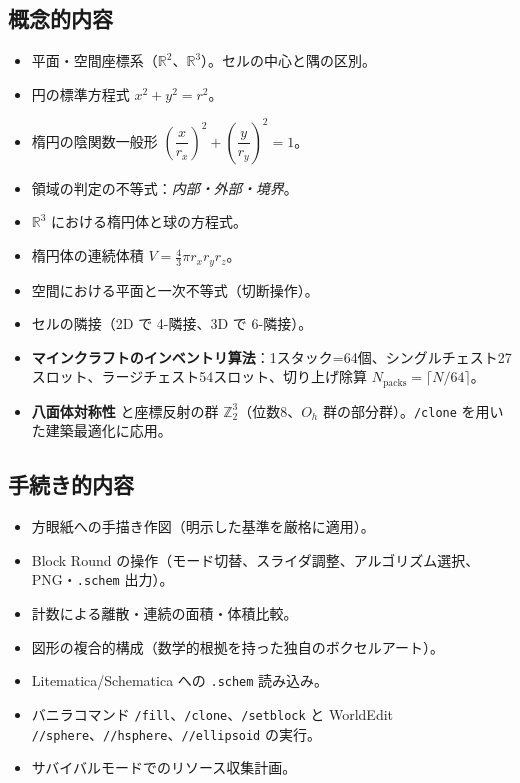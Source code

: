 \documentclass[12pt,a4paper]{scrartcl}
\newcommand{\acc}[1]{\textcolor{accent}{\textbf{#1}}}
\newcommand{\cmd}[1]{\textcolor{earth}{\texttt{\small #1}}}
\begin{document}
\subsection{概念的内容}
\begin{itemize}[leftmargin=1.3em,itemsep=0.15em,topsep=0.3em]
  \item 平面・空間座標系（$\mathbb{R}^2$、$\mathbb{R}^3$）。セルの中心と隅の区別。
  \item 円の標準方程式 $x^2 + y^2 = r^2$。
  \item 楕円の陰関数一般形 $\left(\dfrac{x}{r_x}\right)^{\!2} + \left(\dfrac{y}{r_y}\right)^{\!2} = 1$。
  \item 領域の判定の不等式：\emph{内部・外部・境界}。
  \item $\mathbb{R}^3$ における楕円体と球の方程式。
  \item 楕円体の連続体積 $V = \tfrac{4}{3}\pi r_x r_y r_z$。
  \item 空間における平面と一次不等式（切断操作）。
  \item セルの隣接（2D で 4-隣接、3D で 6-隣接）。
  \item \acc{マインクラフトのインベントリ算法}：1スタック=64個、シングルチェスト27スロット、ラージチェスト54スロット、切り上げ除算 $N_{\mathrm{packs}} = \lceil N/64 \rceil$。
  \item \acc{八面体対称性} と座標反射の群 $\mathbb{Z}_2^3$（位数8、$O_h$ 群の部分群）。\cmd{/clone} を用いた建築最適化に応用。
\end{itemize}

\subsection{手続き的内容}
\begin{itemize}[leftmargin=1.3em,itemsep=0.15em,topsep=0.3em]
  \item 方眼紙への手描き作図（明示した基準を厳格に適用）。
  \item Block Round の操作（モード切替、スライダ調整、アルゴリズム選択、PNG・\texttt{.schem} 出力）。
  \item 計数による離散・連続の面積・体積比較。
  \item 図形の複合的構成（数学的根拠を持った独自のボクセルアート）。
  \item Litematica/Schematica への \texttt{.schem} 読み込み。
  \item バニラコマンド \cmd{/fill}、\cmd{/clone}、\cmd{/setblock} と WorldEdit \cmd{//sphere}、\cmd{//hsphere}、\cmd{//ellipsoid} の実行。
  \item サバイバルモードでのリソース収集計画。
\end{itemize}
\end{document}
